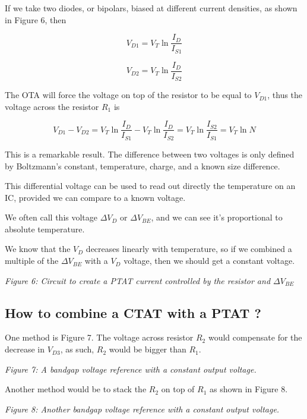 If we take two diodes, or bipolars, biased at different current
densities, as shown in Figure 6, then

\[ V_{D1} = V_T \ln{\frac{I_{D}}{I_{S1}}} \]

\[ V_{D2} = V_T \ln{\frac{I_{D}}{I_{S2}}} \]

The OTA will force the voltage on top of the resistor to be equal to
\(V_{D1}\), thus the voltage across the resistor \(R_1\) is

\[ V_{D1} - V_{D2} = V_T \ln{\frac{I_{D}}{I_{S1}}} - V_T \ln{\frac{I_{D}}{I_{S2}}} = V_T \ln{\frac{I_{S2}}{I_{S1}} }  = V_T \ln N \]

This is a remarkable result. The difference between two voltages is only
defined by Boltzmann's constant, temperature, charge, and a known size
difference.

This differential voltage can be used to read out directly the
temperature on an IC, provided we can compare to a known voltage.

We often call this voltage \(\Delta V_D\) or \(\Delta V_{BE}\), and we
can see it's proportional to absolute temperature.

We know that the \(V_D\) decreases linearly with temperature, so if we
combined a multiple of the \(\Delta V_{BE}\) with a \(V_D\) voltage,
then we should get a constant voltage.


{
\centering
{}
}

\emph{Figure 6: Circuit to create a PTAT current controlled by the
resistor and \(\Delta V_{BE}\) }

\subsection{How to combine a CTAT with a PTAT
?}\label{how-to-combine-a-ctat-with-a-ptat}

One method is Figure 7. The voltage across resistor \(R_2\) would
compensate for the decrease in \(V_{D3}\), as such, \(R_2\) would be
bigger than \(R_1\).


{
\centering
{}
}

\emph{Figure 7: A bandgap voltage reference with a constant output
voltage. }

Another method would be to stack the \(R_2\) on top of \(R_1\) as shown
in Figure 8.


{
\centering
{}
}

\emph{Figure 8: Another bandgap voltage reference with a constant output
voltage. }

